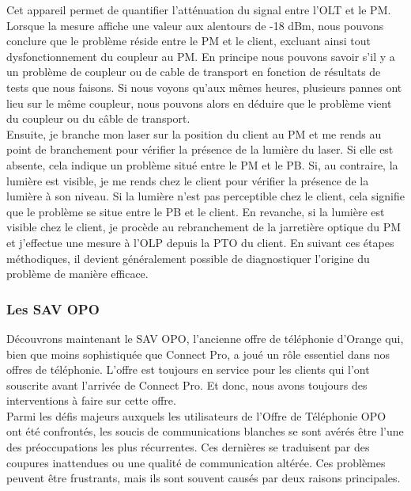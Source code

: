 \documentclass[12pt, a4paper]{article}
\begin{document}
Cet appareil
permet de quantifier l'atténuation du signal
entre l'OLT et le PM. Lorsque la mesure affiche
une valeur aux alentours de -18 dBm, nous pouvons
conclure que le problème réside entre le \gls{PM} et
le client, excluant ainsi tout dysfonctionnement
du coupleur au PM. En principe nous pouvons savoir 
s'il y a un problème de coupleur ou de cable de transport 
en fonction de résultats de tests que nous faisons. Si nous 
voyons qu'aux mêmes heures, plusieurs pannes ont lieu sur
le même coupleur, nous pouvons alors en déduire que le problème
vient du coupleur ou du câble de transport.\\

Ensuite, je branche mon laser sur la position du client au
\gls{PM} et me rends au point de branchement
pour vérifier la présence de la lumière
du laser. Si elle est absente, cela indique
un problème situé entre le \gls{PM} et le \gls{PB}.
Si, au contraire, la lumière est visible,
je me rends chez le client pour vérifier
la présence de la lumière à son niveau.
Si la lumière n'est pas perceptible chez le
client, cela signifie que le problème se
situe entre le \gls{PB} et le client. En revanche,
si la lumière est visible chez le client,
je procède au rebranchement de la jarretière
optique du \gls{PM} et j'effectue une mesure à l'OLP
depuis la \gls{PTO} du client. En suivant ces étapes
méthodiques, il devient généralement possible
de diagnostiquer l'origine du problème de
manière efficace.

\newpage
\subsubsection{Les SAV OPO}
Découvrons maintenant le \gls{SAV} \gls{OPO}, l'ancienne offre de
téléphonie d'Orange qui, bien que moins sophistiquée
que Connect Pro, a joué un rôle essentiel dans nos offres
de téléphonie. L'offre est toujours en service pour les clients
qui l'ont souscrite avant l'arrivée de Connect Pro. Et donc, 
nous avons toujours des interventions à faire sur cette offre.\\

Parmi les défis majeurs auxquels les utilisateurs de l'Offre de
Téléphonie \gls{OPO} ont été confrontés, les soucis de communications
blanches se sont avérés être l'une des préoccupations les plus
récurrentes. Ces dernières se traduisent par des 
coupures inattendues ou une qualité de communication
altérée. Ces problèmes peuvent être frustrants, mais ils sont
souvent causés par deux raisons principales.\\
\end{document}
